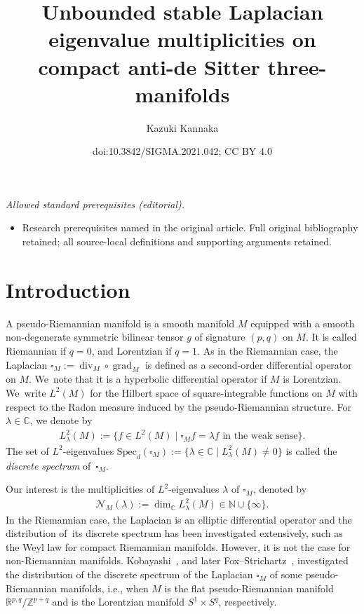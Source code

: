 \documentclass[10pt,a4paper]{amsart}
\title{Unbounded stable Laplacian eigenvalue multiplicities on compact anti-de Sitter three-manifolds}
\author{Kazuki Kannaka}
\date{doi:10.3842/SIGMA.2021.042; CC BY 4.0}
\numberwithin{equation}{section}
\begin{document}
\maketitle
\noindent\textit{Allowed standard prerequisites (editorial).}\begin{itemize}
\item Research prerequisites named in the original article. Full original bibliography retained; all source-local definitions and supporting arguments retained.
\end{itemize}\medskip
\section{Introduction}
A pseudo-Riemannian manifold is a smooth manifold $M$ equipped with
a smooth non-degenerate symmetric bilinear tensor $g$
 of signature $(p,q)$ on $M$.
It is called Riemannian if $q=0$, and Lorentzian if $q=1$.
As in the Riemannian case,
the Laplacian $\square_{M}:=\operatorname{div}_{M} \circ \operatorname{grad}_{M}$
is defined as a second-order differential operator on $M$. We~note that it is a
hyperbolic differential operator if $M$ is Lorentzian. We~write $L^2(M)$ for the Hilbert space of square-integrable functions on $M$
with respect to the Radon measure induced by the pseudo-Riemannian structure.
For $\lambda \in \mathbb{C}$, we denote by
\begin{gather*}
L^2_{\lambda}(M) :=
\big\{f \in L^2(M) \mid \square_{M}f = \lambda f \text{ in the weak sense}\big\}.
\end{gather*}
The set of $L^2$-eigenvalues
$\mathrm{Spec}_{d}(\square_{M}) := \big\{ \lambda \in \mathbb{C}
\mid L^2_{\lambda}(M)\neq0\big\}$
is called the \textit{discrete spectrum} of~$\square_{M}$.

Our interest is the multiplicities of $L^2$-eigenvalues $\lambda$ of $\square_{M}$,
denoted by
\begin{gather*}
\mathcal{N}_{M}(\lambda):= \operatorname{dim}_{\mathbb{C}}L^2_{\lambda}(M)
\in \mathbb{N}\cup\{\infty\}.
\end{gather*}
In the Riemannian case, the Laplacian is an elliptic differential operator
and the distribution of~its discrete spectrum has been investigated extensively,
such as the Weyl law for compact Riemannian manifolds.
However, it is not the case for non-Riemannian manifolds.
Kobayashi~\cite{Kob16}, and later Fox--Strichartz~\cite{FoSt18},
investigated the distribution of the discrete spectrum of
the Laplacian $\square_{M}$ of some pseudo-Riemannian manifolds, i.e., when
$M$ is the flat pseudo-Riemannian manifold $\mathbb{R}^{p,q}/\mathbb{Z}^{p+q}$
and is the Lorentzian manifold $S^1\times S^{q}$, respectively.
\end{document}
